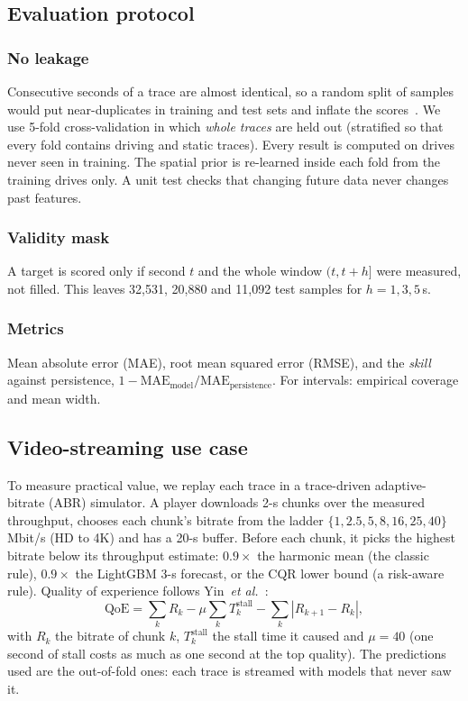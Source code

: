 \documentclass[10pt,a4paper,twocolumn]{article}
\begin{document}
\subsection{Evaluation protocol}
\label{sec:protocol}
\subsubsection{No leakage}
Consecutive seconds of a trace are almost identical, so a random split of samples would
put near-duplicates in training and test sets and inflate the scores~\cite{arp}. We use
5-fold cross-validation in which \emph{whole traces} are held out (stratified so that every
fold contains driving and static traces). Every result is computed on drives never seen in
training. The spatial prior is re-learned inside each fold from the training drives only.
A unit test checks that changing future data never changes past features.

\subsubsection{Validity mask}
A target is scored only if second $t$ and the whole window $(t,t+h]$ were measured, not
filled. This leaves 32,531, 20,880 and 11,092 test samples for $h=1,3,5$\,s.

\subsubsection{Metrics}
Mean absolute error (MAE), root mean squared error (RMSE), and the \emph{skill} against
persistence, $1-\text{MAE}_{\text{model}}/\text{MAE}_{\text{persistence}}$. For intervals:
empirical coverage and mean width.

\subsection{Video-streaming use case}
\label{sec:abrmethod}
To measure practical value, we replay each trace in a trace-driven adaptive-bitrate (ABR)
simulator. A player downloads 2-s chunks over the measured throughput, chooses each
chunk's bitrate from the ladder $\{1, 2.5, 5, 8, 16, 25, 40\}$\,Mbit/s (HD to 4K) and has a
20-s buffer. Before each chunk, it picks the highest bitrate below its throughput estimate:
$0.9\times$ the harmonic mean (the classic rule), $0.9\times$ the LightGBM 3-s forecast, or
the CQR lower bound (a risk-aware rule). Quality of experience follows
Yin~\textit{et al.}~\cite{yin2015}:
\begin{equation}
\text{QoE}=\sum_k R_k-\mu\sum_k T^{\text{stall}}_k-\sum_k |R_{k+1}-R_k|,
\label{eq:qoe}
\end{equation}
with $R_k$ the bitrate of chunk $k$, $T^{\text{stall}}_k$ the stall time it caused and
$\mu=40$ (one second of stall costs as much as one second at the top quality). The
predictions used are the out-of-fold ones: each trace is streamed with models that never
saw it.
\end{document}
